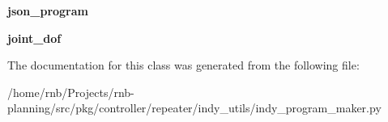 \begin{DoxyCompactItemize}
{\bfseries json\+\_\+program}
\item 
\mbox{\label{classrnb-planning_1_1src_1_1pkg_1_1controller_1_1repeater_1_1indy__utils_1_1indy__program__maker_1_1_json_program_component_a3aeb6a6b7adac0e10bf95bcf10263f1c}} 
{\bfseries joint\+\_\+dof}
\end{DoxyCompactItemize}


The documentation for this class was generated from the following file\+:\begin{DoxyCompactItemize}
\item 
/home/rnb/\+Projects/rnb-\/planning/src/pkg/controller/repeater/indy\+\_\+utils/indy\+\_\+program\+\_\+maker.\+py\end{DoxyCompactItemize}
